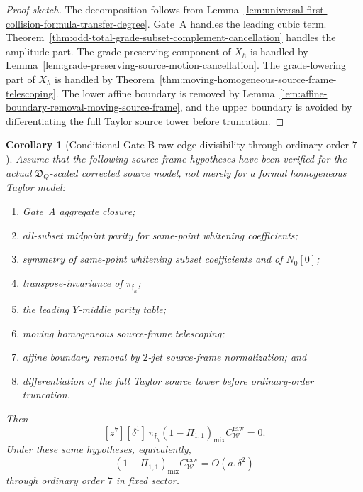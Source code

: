 \documentclass[11pt,a4paper]{amsart}
\theoremstyle{plain}
\newtheorem{corollary}[theorem]{Corollary}
\theoremstyle{definition}
\begin{document}
\begin{proof}[Proof sketch]
The decomposition follows from
Lemma~\ref{lem:universal-first-collision-formula-transfer-degree}.  Gate~A
handles the leading cubic term.
Theorem~\ref{thm:odd-total-grade-subset-complement-cancellation} handles
the amplitude part.  The grade-preserving component of \(X_h\) is handled
by Lemma~\ref{lem:grade-preserving-source-motion-cancellation}.  The
grade-lowering part of \(X_h\) is
handled by Theorem~\ref{thm:moving-homogeneous-source-frame-telescoping}.
The lower affine boundary is removed by
Lemma~\ref{lem:affine-boundary-removal-moving-source-frame}, and the
upper boundary is avoided by differentiating the full Taylor source tower
before truncation.
\end{proof}

\begin{corollary}[Conditional Gate B raw edge-divisibility through ordinary order \(7\)]
\label{cor:gate-b-raw-edge-divisibility-order-seven}
Assume that the following source-frame hypotheses have been verified for the
actual \(\mathfrak D_Q\)-scaled corrected source model, not merely for a
formal homogeneous Taylor model:
\begin{enumerate}
\item Gate~A aggregate closure;
\item all-subset midpoint parity for same-point whitening coefficients;
\item symmetry of same-point whitening subset coefficients and of
\(N_0[0]\);
\item transpose-invariance of \(\pi_{\mathfrak f_h}\);
\item the leading \(Y\)-middle parity table;
\item moving homogeneous source-frame telescoping;
\item affine boundary removal by \(2\)-jet source-frame normalization;
and
\item differentiation of the full Taylor source tower before
ordinary-order truncation.
\end{enumerate}
Then
\[
\boxed{
[z^7][\delta^1]\,
\pi_{\mathfrak f_h}
(1-\Pi_{1,1})_{\mathrm{mix}}C_{\mathcal W}^{\mathrm{raw}}=0.
}
\]
Under these same hypotheses, equivalently,
\[
\boxed{
(1-\Pi_{1,1})_{\mathrm{mix}}C_{\mathcal W}^{\mathrm{raw}}
=
O(a_1\delta^2)
}
\]
through ordinary order \(7\) in fixed sector.
\end{corollary}
\end{document}
